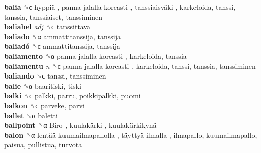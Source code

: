 \textbf{balia} ␝ϲ   hyppiä ,  panna jalalla koreasti ,  tanssiaisväki , karkeloida, tanssi, tanssia, tanssiaiset, tanssiminen  \\
\textbf{baliabel} \emph{adj}  ␝ϲ  tanssittava  \\
\textbf{baliado} ␝α  ammattitanssija, tanssija  \\
\textbf{baliadó} ␝ϲ  ammattitanssija, tanssija  \\
\textbf{baliamento} ␝α   panna jalalla koreasti , karkeloida, tanssia  \\
\textbf{baliamentu} \emph{n}  ␝ϲ   panna jalalla koreasti , karkeloida, tanssi, tanssia, tanssiminen  \\
\textbf{baliando} ␝ϲ  tanssi, tanssiminen  \\
\textbf{balie} ␝α  baaritiski, tiski  \\
\textbf{balki} ␝ϲ  palkki, parru, poikkipalkki, puomi  \\
\textbf{balkon} ␝ϲ  parveke, parvi  \\
\textbf{ballet} ␝α  baletti  \\
\textbf{ballpoint} ␝α   Biro ,  kuulakärki ,  kuulakärkikynä   \\
\textbf{balon} ␝α   lentää kuumailmapallolla ,  täyttyä ilmalla , ilmapallo, kuumailmapallo, paisua, pullistua, turvota  \\

